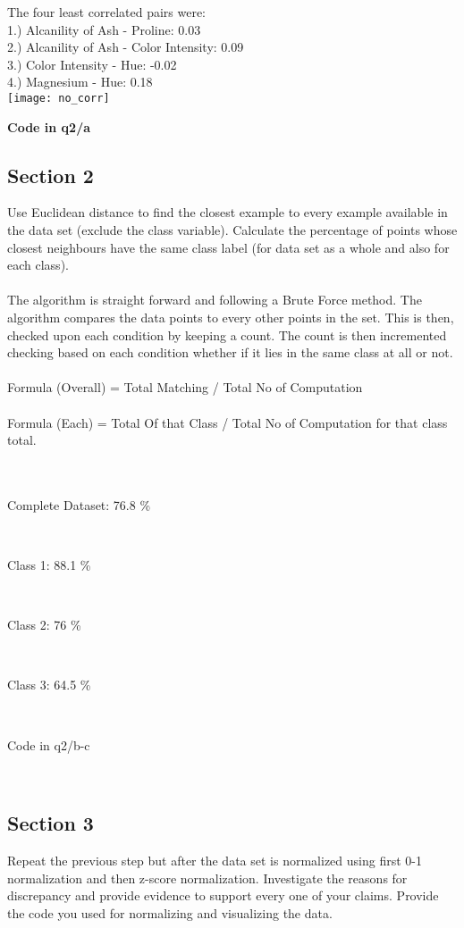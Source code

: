 \documentclass[12pt,a4paper,titlepage]{article}
\begin{document}
{{{The four least correlated pairs were:\\
1.) Alcanility of Ash - Proline: 0.03\\
2.) Alcanility of Ash - Color Intensity: 0.09\\
3.) Color Intensity - Hue: -0.02\\
4.) Magnesium - Hue: 0.18\\
\texttt{[image: no\_corr]}\\

\centerline{\textbf{Code in q2/a}}
}


\subsection{Section 2}{
Use Euclidean distance to find the closest example to every example available in the data set (exclude the class variable). Calculate the percentage of points whose closest neighbours have the same class label (for data set as a whole and also for each class).\\~\\
The algorithm is straight forward and following a Brute Force method. The algorithm compares the data points to every other points in the set. This is then, checked upon each condition by keeping a count. The count is then incremented checking based on each condition whether if it lies in the same class at all or not.\\~\\
Formula (Overall) = Total Matching / Total No of Computation\\~\\
Formula (Each) = Total Of that Class / Total No of Computation for that class total.\\~\\
~\\
\centerline{Complete Dataset: 76.8 \%}~\\
\centerline{Class 1: 88.1 \%}~\\
\centerline{Class 2: 76 \%}~\\
\centerline{Class 3: 64.5 \%}~\\
\centerline{Code in q2/b-c}~\\


}

\subsection{Section 3}{
Repeat the previous step but after the data set is normalized using first 0-1 normalization and then z-score normalization. Investigate the reasons for discrepancy and provide evidence to support every one of your claims. Provide the code you used for normalizing and visualizing the data.
}



}}
\end{document}
